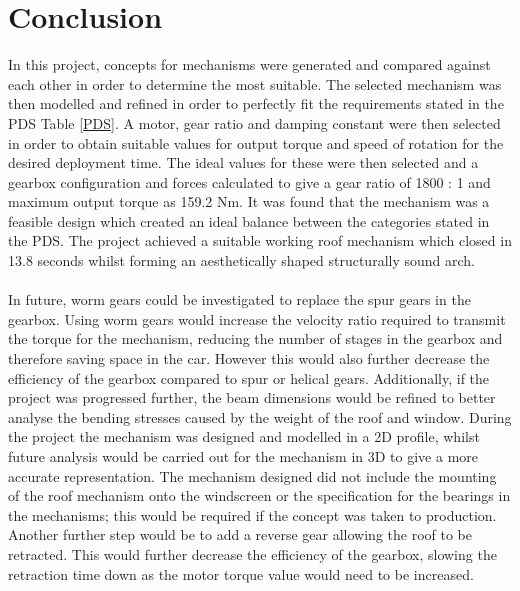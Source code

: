\documentclass[a4paper]{article}
\begin{document}
\section{Conclusion}
In this project, concepts for mechanisms were generated and compared against each other in order to determine the most suitable. The selected mechanism was then modelled and refined in order to perfectly fit the requirements stated in the PDS Table \ref{PDS}. A motor, gear ratio and damping constant were then selected in order to obtain suitable values for output torque and speed of rotation for the desired deployment time. The ideal values for these were then selected and a gearbox configuration and forces calculated to give a gear ratio of 1800 : 1 and maximum output torque as 159.2 Nm. It was found that the mechanism was a feasible design which created an ideal balance between the categories stated in the PDS. The project achieved a suitable working roof mechanism which closed in 13.8 seconds whilst forming an aesthetically shaped structurally sound arch.

\paragraph{}
In future, worm gears could be investigated to replace the spur gears in the gearbox. Using worm gears would increase the velocity ratio required to transmit the torque for the mechanism, reducing the number of stages in the gearbox and therefore saving space in the car. However this would also further decrease the efficiency of the gearbox compared to spur or helical gears. Additionally, if the project was progressed further, the beam dimensions would be refined to better analyse the bending stresses caused by the weight of the roof and window. During the project the mechanism was designed and modelled in a 2D profile, whilst future analysis would be carried out for the mechanism in 3D to give a more accurate representation. The mechanism designed did not include the mounting of the roof mechanism onto the windscreen or the specification for the bearings in the mechanisms; this would be required if the concept was taken to production. Another further step would be to add a reverse gear allowing the roof to be retracted. This would further decrease the efficiency of the gearbox, slowing the retraction time down as the motor torque value would need to be increased.









\end{document}
